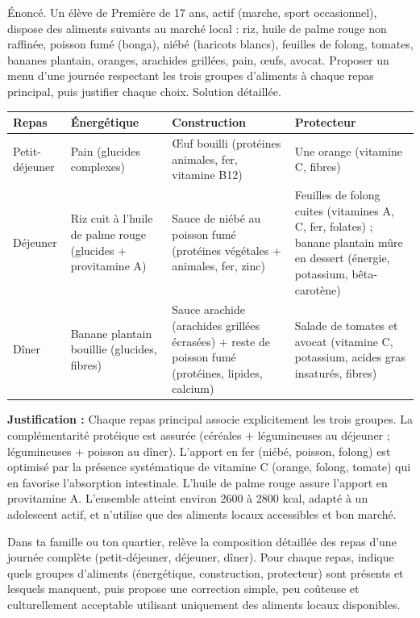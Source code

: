 \documentclass[11pt]{article}
\begin{document}
\begin{exoresolu}
Énoncé. Un élève de Première de 17 ans, actif (marche, sport occasionnel), dispose des aliments suivants au marché local : riz, huile de palme rouge non raffinée, poisson fumé (bonga), niébé (haricots blancs), feuilles de folong, tomates, bananes plantain, oranges, arachides grillées, pain, œufs, avocat. Proposer un menu d'une journée respectant les trois groupes d'aliments à chaque repas principal, puis justifier chaque choix.
\tcblower
Solution détaillée.
\begin{center}
\begin{tabularx}{\linewidth}{|l|X|X|X|}
\hline
\rowcolor{popgreenL} \textbf{Repas} & \textbf{Énergétique} & \textbf{Construction} & \textbf{Protecteur} \\
\hline
Petit-déjeuner & Pain (glucides complexes) & Œuf bouilli (protéines animales, fer, vitamine B12) & Une orange (vitamine C, fibres) \\
\hline
Déjeuner & Riz cuit à l'huile de palme rouge (glucides + provitamine A) & Sauce de niébé au poisson fumé (protéines végétales + animales, fer, zinc) & Feuilles de folong cuites (vitamines A, C, fer, folates) ; banane plantain mûre en dessert (énergie, potassium, bêta-carotène) \\
\hline
Dîner & Banane plantain bouillie (glucides, fibres) & Sauce arachide (arachides grillées écrasées) + reste de poisson fumé (protéines, lipides, calcium) & Salade de tomates et avocat (vitamine C, potassium, acides gras insaturés, fibres) \\
\hline
\end{tabularx}
\end{center}
\textbf{Justification :} Chaque repas principal associe explicitement les trois groupes. La complémentarité protéique est assurée (céréales + légumineuses au déjeuner ; légumineuses + poisson au dîner). L'apport en fer (niébé, poisson, folong) est optimisé par la présence systématique de vitamine C (orange, folong, tomate) qui en favorise l'absorption intestinale. L'huile de palme rouge assure l'apport en provitamine A. L'ensemble atteint environ \num{2600} à \num{2800} kcal, adapté à un adolescent actif, et n'utilise que des aliments locaux accessibles et bon marché.
\end{exoresolu}

\begin{exercice}
Dans ta famille ou ton quartier, relève la composition détaillée des repas d'une journée complète (petit-déjeuner, déjeuner, dîner). Pour chaque repas, indique quels groupes d'aliments (énergétique, construction, protecteur) sont présents et lesquels manquent, puis propose une correction simple, peu coûteuse et culturellement acceptable utilisant uniquement des aliments locaux disponibles.
\end{exercice}
\end{document}
